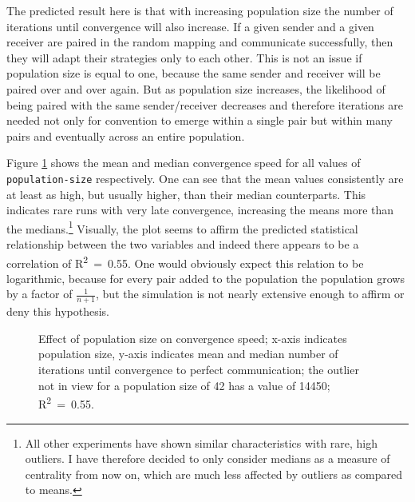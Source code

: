\documentclass[
	DIV=calc,
	BCOR=0mm,
	pagesize,
]{scrartcl}
\newcommand{\code}[1]{\texttt{#1}}
\begin{document}
The predicted result here is that with increasing population size the number of iterations until convergence will also increase.
If a given sender and a given receiver are paired in the random mapping and communicate successfully, then they will adapt their strategies only to each other.
This is not an issue if population size is equal to one, because the same sender and receiver will be paired over and over again.
But as population size increases, the likelihood of being paired with the same sender/receiver decreases and therefore iterations are needed not only for convention to emerge within a single pair but within many pairs and eventually across an entire population.

Figure \ref{fig:pop} shows the mean and median convergence speed for all values of \code{population-size} respectively.
One can see that the mean values consistently are at least as high, but usually higher, than their median counterparts.
This indicates rare runs with very late convergence, increasing the means more than the medians.\footnote{All other experiments have shown similar characteristics with rare, high outliers. I have therefore decided to only consider medians as a measure of centrality from now on, which are much less affected by outliers as compared to means.}
Visually, the plot seems to affirm the predicted statistical relationship between the two variables and indeed there appears to be a correlation of R\textsuperscript{2}~=~0.55.
One would obviously expect this relation to be logarithmic, because for every pair added to the population the population grows by a factor of \(\frac{1}{n+1}\), but the simulation is not nearly extensive enough to affirm or deny this hypothesis.

\begin{figure}
	\centering
	\caption{Effect of population size on convergence speed; x-axis indicates population size, y-axis indicates mean and median number of iterations until convergence to perfect communication; the outlier not in view for a population size of 42 has a value of 14450; R\textsuperscript{2}~=~0.55.}
	\label{fig:pop}
\end{figure}
\end{document}
